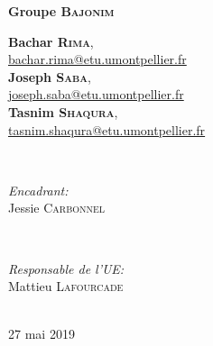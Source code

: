 \documentclass[12pt,a4paper]{report}
\begin{document}
\begin{titlepage}
{ \huge \bfseries Groupe \textsc{Bajonim}}\\[0.4cm]
\begin{minipage}{0.4\textwidth}
\centering \small
\textbf{Bachar \textsc{Rima}}, \\ \href{mailto:bachar.rima@etu.umontpellier.fr}{bachar.rima@etu.umontpellier.fr}\\ %
\textbf{Joseph \textsc{Saba}}, \\ \href{mailto:joseph.saba@etu.umontpellier.fr}{joseph.saba@etu.umontpellier.fr}\\ %
\textbf{Tasnim \textsc{Shaqura}}, \\ \href{mailto:tasnim.shaqura@etu.umontpellier.fr}{tasnim.shaqura@etu.umontpellier.fr}\\ %
\end{minipage} \\[0.8cm]

\begin{minipage}[b]{0.4\textwidth}
\begin{flushleft} \large
\emph{Encadrant:} \\
Jessie \textsc{Carbonnel} %
\end{flushleft}
\end{minipage}
~
\begin{minipage}[b]{0.4\textwidth}
\begin{flushright} \large
\emph{Responsable de l'UE:} \\
Mattieu \textsc{Lafourcade} %
\end{flushright}
\end{minipage}\\[1.5cm]

{\large 27 mai 2019}\\[1cm]
\hspace{\fill}
\vfill %
\end{titlepage}

\tableofcontents
\end{document}
